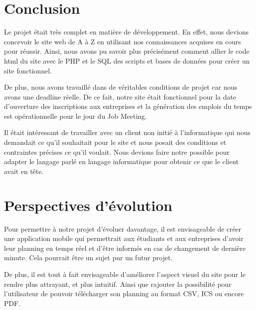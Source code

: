 \documentclass[12pt,a4paper]{article}
\begin{document}
\section{Conclusion}

\begin{large}
\begin{onehalfspace}    Le projet était très complet en matière de développement. En effet, nous devions concevoir le site web de A à Z en utilisant nos connaissances acquises en cours pour réussir. Ainsi, nous avons pu savoir plus précisément comment allier le code html du site avec le PHP et le SQL des scripts et bases de données pour créer un site fonctionnel.

    De plus, nous avons travaillé dans de véritables conditions de projet car nous avons une deadline réelle. De ce fait, notre site était fonctionnel pour la date d’ouverture des inscriptions aux entreprises et la génération des emplois du temps est opérationnelle pour le jour du Job Meeting.

    Il était intéressant de travailler avec un client non initié à l’informatique qui nous demandait ce qu’il souhaitait pour le site et nous posait des conditions et contraintes précises ce qu’il voulait. Nous devions faire notre possible pour adapter le langage parlé en langage informatique pour obtenir ce que le client avait en tête.
\end{onehalfspace}
\end{large}

\section{Perspectives d'évolution}

\begin{large}
\begin{onehalfspace}Pour permettre à notre projet d’évoluer davantage, il est envisageable de  créer une application mobile qui permettrait aux étudiants et aux entreprises d’avoir leur planning en temps réel et d’être informés en cas de changement de dernière minute. Cela pourrait être un sujet pur un futur projet.

	De plus, il est tout à fait envisageable d’améliorer l’aspect visuel du site pour le rendre plus attrayant, et plus intuitif. Ainsi que rajouter la possibilité pour l’utilisateur de pouvoir télécharger son planning au format CSV, ICS ou encore PDF.
\end{onehalfspace}
\end{large}
\end{document}
